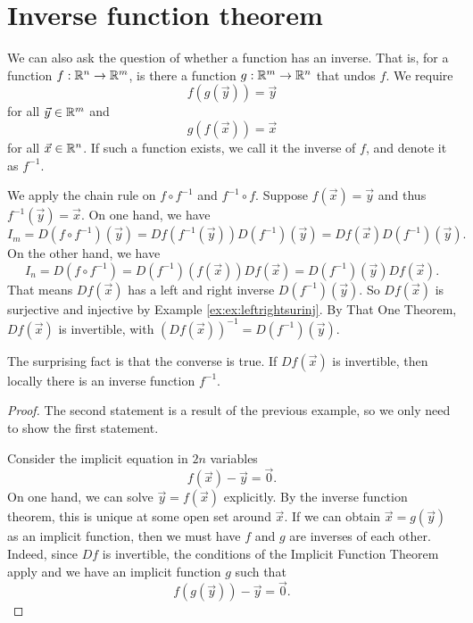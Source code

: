 \section{Inverse function theorem}
We can also ask the question of whether a function has an inverse. That is, for a function $f:\mathbb{R}^n\to\mathbb{R}^m$, is there a function $g:\mathbb{R}^m\to\mathbb{R}^n$ that undos $f$. We require \[
    f(g(\vec{y})) = \vec{y} 
\]
for all $\vec{y}\in\mathbb{R}^m$ and \[
g(f(\vec{x}))=\vec{x}
\]
for all $\vec{x}\in \mathbb{R}^n$. If such a function exists, we call it the inverse of $f$, and denote it as $f^{-1}$.


We apply the chain rule on $f\circ f^{-1}$ and $f^{-1}\circ f$. Suppose $f(\vec{x})=\vec{y}$ and thus $f^{-1}(\vec{y})=\vec{x}$.
On one hand, we have \[
I_m=D(f\circ f^{-1})(\vec{y}) = Df (f^{-1}(\vec{y})) D(f^{-1})(\vec{y})= Df (\vec{x}) D(f^{-1})(\vec{y}).
\]
On the other hand, we have \[
    I_n=D(f\circ f^{-1}) = D(f^{-1}) (f(\vec{x})) Df(\vec{x})= D(f^{-1}) (\vec{y}) Df(\vec{x}).
\]
That means $Df(\vec{x})$ has a left and right inverse $D(f^{-1})(\vec{y})$. So $Df(\vec{x})$ is surjective and injective by Example \ref{ex:ex:leftrightsurinj}. By That One Theorem, $Df(\vec{x})$ is invertible, with $(Df(\vec{x}))^{-1}=D(f^{-1})(\vec{y})$.

The surprising fact is that the converse is true. If $Df(\vec{x})$ is invertible, then locally there is an inverse function $f^{-1}$.
\begin{proof}
    The second statement is a result of the previous example, so we only need to show the first statement. 

    Consider the implicit equation in $2n$ variables \[
    f(\vec{x}) -\vec{y}=\vec{0}.
    \]
    On one hand, we can solve $\vec{y}=f(\vec{x})$ explicitly. By the inverse function theorem, this is unique at some open set around $\vec{x}$. If we can obtain $\vec{x} = g(\vec{y})$ as an implicit function, then we must have $f$ and $g$ are inverses of each other. Indeed, since $Df$ is invertible, the conditions of the Implicit Function Theorem apply and we have an implicit function $g$ such that \[
    f(g(\vec{y}))-\vec{y}=\vec{0}.
    \]
\end{proof}
\exercises
